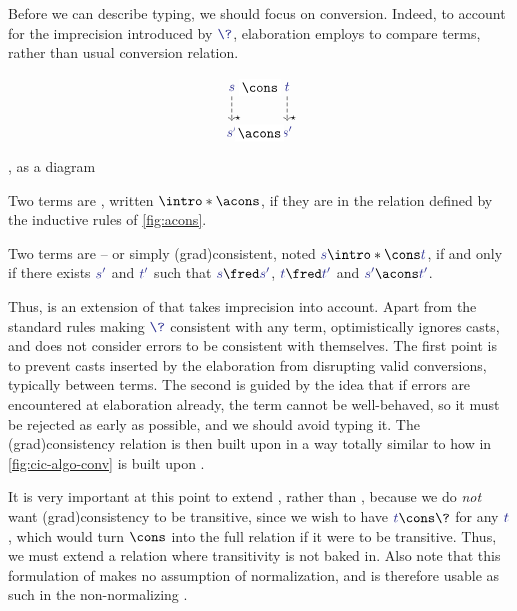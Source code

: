 Before we can describe typing, we should focus on conversion. Indeed, to account for the imprecision introduced by $\tcol{\?}$, elaboration employs 
to compare  terms, rather than usual conversion relation.

\begin{marginfigure}[4em]
  \[\begin{tikzcd}
    \tcol{s} \arrow[d, dashed, "\star" very near end] \arrow[r, phantom, "\cons" description] &
    \tcol{t} \arrow[d, dashed, "\star" very near end] \\
    \tcol{s'} \arrow[r,phantom,"\acons" description] & \tcol{s'}
  \end{tikzcd}\]
  \caption{, as a diagram}
\end{marginfigure}

\begin{definition}
	\label{def:cons}
	\AP Two  terms are , written $\intro*\acons$,
  if they are in the relation defined by the inductive rules of \cref{fig:acons}.

	Two terms are  – or simply \reintro(grad){consistent},
  noted $\tcol{s} \intro*\cons \tcol{t}$, if and only if there exists $\tcol{s'}$ and $\tcol{t'}$ such that $\tcol{s} \red \tcol{s'}$, $\tcol{t} \red \tcol{t'}$ and $\tcol{s'} \acons \tcol{t'}$.
\end{definition}

Thus,  is an extension of  that takes imprecision into account.
Apart from the standard rules making $\tcol{\?}$ consistent with any term,
 optimistically ignores casts,
and does not consider errors to be consistent with themselves.
The first point is to prevent casts inserted by the elaboration from disrupting valid
conversions, typically between  terms.
The second is guided by the idea that if errors are encountered at elaboration already,
the term cannot be well-behaved,
so it must be rejected as early as possible, and we should avoid typing it.
The \kl(grad){consistency} relation is then built upon  in a way totally similar to
how  in \cref{fig:cic-algo-conv} is built upon .

It is very important at this point to extend , rather than
, because we do \emph{not} want \kl(grad){consistency}
to be transitive,
since we wish to have $\tcol{t} \cons \?$ for any $\tcol{t}$, which would turn $\cons$ into
the full relation if it were to be transitive. Thus, we must extend a relation where
transitivity is not baked in.
Also note that this formulation of  makes no assumption of
normalization, and is therefore usable as such in the non-normalizing .

